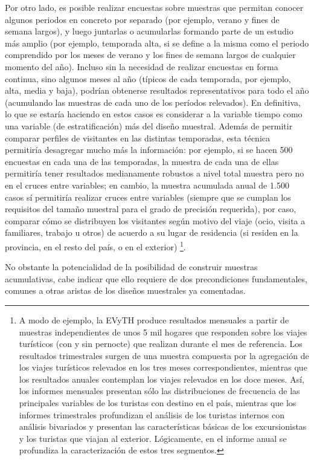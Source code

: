 \documentclass[
]{book}
\begin{document}
Por otro lado, es posible realizar encuestas sobre muestras que permitan conocer algunos periodos en concreto por separado (por ejemplo, verano y fines de semana largos), y luego juntarlas o acumularlas formando parte de un estudio más amplio (por ejemplo, temporada alta, si se define a la misma como el periodo comprendido por los meses de verano y los fines de semana largos de cualquier momento del año). Incluso sin la necesidad de realizar encuestas en forma continua, sino algunos meses al año (típicos de cada temporada, por ejemplo, alta, media y baja), podrían obtenerse resultados representativos para todo el año (acumulando las muestras de cada uno de los períodos relevados). En definitiva, lo que se estaría haciendo en estos casos es considerar a la variable tiempo como una variable (de estratificación) más del diseño muestral. Además de permitir comparar perfiles de visitantes en las distintas temporadas, esta técnica permitiría desagregar mucho más la información: por ejemplo, si se hacen 500 encuestas en cada una de las temporadas, la muestra de cada una de ellas permitiría tener resultados medianamente robustos a nivel total muestra pero no en el cruces entre variables; en cambio, la muestra acumulada anual de 1.500 casos sí permitiría realizar cruces entre variables (siempre que se cumplan los requisitos del tamaño muestral para el grado de precisión requerida), por caso, comparar cómo se distribuyen los visitantes según motivo del viaje (ocio, visita a familiares, trabajo u otros) de acuerdo a su lugar de residencia (si residen en la provincia, en el resto del país, o en el exterior) \footnote{A modo de ejemplo, la EVyTH produce resultados mensuales a partir de muestras independientes de unos 5 mil hogares que responden sobre los viajes turísticos (con y sin pernocte) que realizan durante el mes de referencia. Los resultados trimestrales surgen de una muestra compuesta por la agregación de los viajes turísticos relevados en los tres meses correspondientes, mientras que los resultados anuales contemplan los viajes relevados en los doce meses. Así, los informes mensuales presentan sólo las distribuciones de frecuencia de las principales variables de los turistas con destino en el país, mientras que los informes trimestrales profundizan el análisis de los turistas internos con análisis bivariados y presentan las características básicas de los excursionistas y los turistas que viajan al exterior. Lógicamente, en el informe anual se profundiza la caracterización de estos tres segmentos.}.

No obstante la potencialidad de la posibilidad de construir muestras acumulativas, cabe indicar que ello requiere de dos precondiciones fundamentales, comunes a otras aristas de los diseños muestrales ya comentadas.
\end{document}

